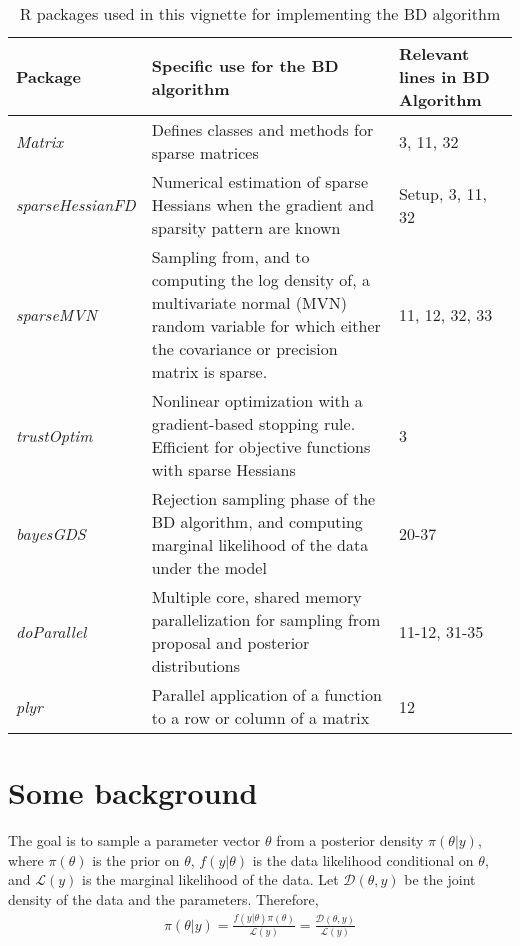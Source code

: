 \documentclass[10pt]{article}\usepackage[]{graphicx}\usepackage[]{color}
\newcommand{\pkg}[1]{\emph{#1}}
\newcommand{\proglang}[1]{\textsf{#1}}
\begin{document}
\begin{table}[htb]
  \centering
  \begin{tabular}{p{1in} p{3.3in} p{1.1in}}
    Package&Specific use for the BD algorithm&Relevant lines in
                                               BD Algorithm\\
\hline
    \pkg{Matrix}&Defines classes and methods for sparse matrices&3, 11, 32\\
    \hline
    \pkg{sparseHessianFD}&Numerical estimation of sparse Hessians when
                     the gradient and sparsity pattern are known&Setup, 3, 11, 32\\
    \hline
    \pkg{sparseMVN}&Sampling from, and to computing the
               log density of, a multivariate normal (MVN) random
               variable for which either the covariance or precision
               matrix is sparse. &11, 12, 32, 33\\
    \hline
    \pkg{trustOptim}&Nonlinear optimization with a gradient-based
                      stopping rule.  Efficient for objective functions with sparse Hessians&3\\
    \hline
    \pkg{bayesGDS}&Rejection sampling phase of the BD algorithm, and
                    computing marginal likelihood of the data under
                    the model&20-37\\
    \hline
    \pkg{doParallel}&Multiple core, shared memory parallelization for
                      sampling from proposal and posterior
                      distributions&11-12, 31-35\\
    \hline
    \pkg{plyr}&Parallel application of a function to a row or column of a matrix&12\\
    \hline
  \end{tabular}
  \caption{\proglang{R} packages used in this vignette for
    implementing the BD algorithm}
  \label{tab:packages}
\end{table}



\section{Some background}

The goal is to sample a
parameter vector $\theta$ from a posterior density $\pi(\theta|y)$,
where $\pi(\theta)$ is the prior on $\theta$, $f(y|\theta)$ is the data
likelihood conditional on $\theta$, and $\mathcal{L}(y)$ is the marginal
likelihood of the data.  Let $\mathcal{D}(\theta,y)$ be the joint
density of the data and the parameters. Therefore,
\begin{align}
\pi(\theta|y)=\frac{f(y|\theta)\pi(\theta)}{\mathcal{L}(y)}=\frac{\mathcal{D}(\theta,y)}{\mathcal{L}(y)}
\end{align}
\end{document}
